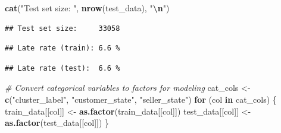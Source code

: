 \documentclass[
]{article}
\newenvironment{Shaded}{\begin{snugshade}}{\end{snugshade}}
\newcommand{\CommentTok}[1]{\textcolor[rgb]{0.56,0.35,0.01}{\textit{#1}}}
\newcommand{\ControlFlowTok}[1]{\textcolor[rgb]{0.13,0.29,0.53}{\textbf{#1}}}
\newcommand{\DecValTok}[1]{\textcolor[rgb]{0.00,0.00,0.81}{#1}}
\newcommand{\FunctionTok}[1]{\textcolor[rgb]{0.13,0.29,0.53}{\textbf{#1}}}
\newcommand{\NormalTok}[1]{#1}
\newcommand{\OtherTok}[1]{\textcolor[rgb]{0.56,0.35,0.01}{#1}}
\newcommand{\SpecialCharTok}[1]{\textcolor[rgb]{0.81,0.36,0.00}{\textbf{#1}}}
\newcommand{\StringTok}[1]{\textcolor[rgb]{0.31,0.60,0.02}{#1}}
\begin{document}
\begin{Shaded}
\begin{Highlighting}[]
\FunctionTok{cat}\NormalTok{(}\StringTok{"Test set size:    "}\NormalTok{, }\FunctionTok{nrow}\NormalTok{(test\_data), }\StringTok{"}\SpecialCharTok{\textbackslash{}n}\StringTok{"}\NormalTok{)}
\end{Highlighting}
\end{Shaded}

\begin{verbatim}
## Test set size:     33058
\end{verbatim}

\begin{Shaded}
\end{Shaded}

\begin{verbatim}
## Late rate (train): 6.6 %
\end{verbatim}

\begin{Shaded}
\end{Shaded}

\begin{verbatim}
## Late rate (test):  6.6 %
\end{verbatim}

\begin{Shaded}
\begin{Highlighting}[]
\CommentTok{\# Convert categorical variables to factors for modeling}
\NormalTok{cat\_cols }\OtherTok{\textless{}{-}} \FunctionTok{c}\NormalTok{(}\StringTok{"cluster\_label"}\NormalTok{, }\StringTok{"customer\_state"}\NormalTok{, }\StringTok{"seller\_state"}\NormalTok{)}
\ControlFlowTok{for}\NormalTok{ (col }\ControlFlowTok{in}\NormalTok{ cat\_cols) \{}
\NormalTok{  train\_data[[col]] }\OtherTok{\textless{}{-}} \FunctionTok{as.factor}\NormalTok{(train\_data[[col]])}
\NormalTok{  test\_data[[col]]  }\OtherTok{\textless{}{-}} \FunctionTok{as.factor}\NormalTok{(test\_data[[col]])}
\NormalTok{\}}
\end{Highlighting}
\end{Shaded}
\end{document}
